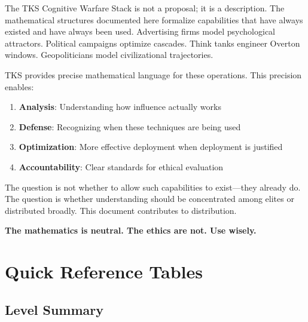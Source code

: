 \documentclass[11pt,twoside]{book}
\begin{document}
\begin{tcolorbox}[colback=gray!10!white,colframe=gray!75!black,title=\textbf{Final Technical Note}]

The TKS Cognitive Warfare Stack is not a proposal; it is a description. The
mathematical structures documented here formalize capabilities that have always
existed and have always been used. Advertising firms model psychological attractors.
Political campaigns optimize cascades. Think tanks engineer Overton windows.
Geopoliticians model civilizational trajectories.

TKS provides precise mathematical language for these operations. This precision
enables:
\begin{enumerate}
    \item \textbf{Analysis}: Understanding how influence actually works
    \item \textbf{Defense}: Recognizing when these techniques are being used
    \item \textbf{Optimization}: More effective deployment when deployment is justified
    \item \textbf{Accountability}: Clear standards for ethical evaluation
\end{enumerate}

The question is not whether to allow such capabilities to exist---they already do.
The question is whether understanding should be concentrated among elites or
distributed broadly. This document contributes to distribution.

\textbf{The mathematics is neutral. The ethics are not. Use wisely.}

\end{tcolorbox}

\appendix
\chapter{Quick Reference Tables}
\label{app:quick-reference}

\section{Level Summary}
\end{document}
